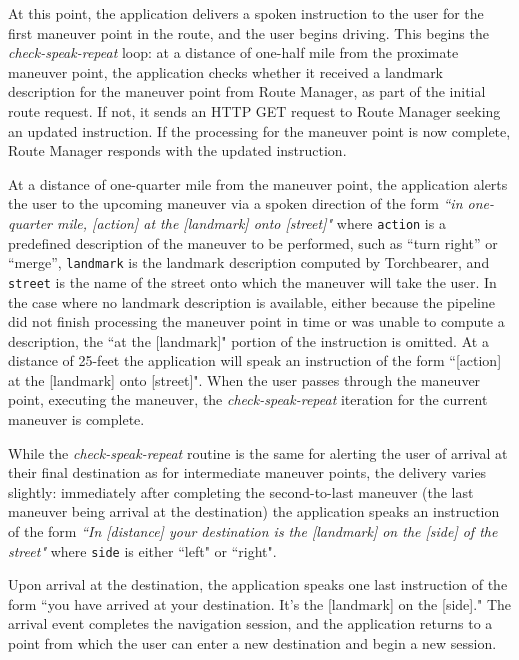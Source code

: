 At this point, the application delivers a spoken instruction to the user for the first maneuver point in the route, and the user begins driving. This begins the \textit{check-speak-repeat} loop: at a distance of one-half mile from the proximate maneuver point, the application checks whether it received a landmark description for the maneuver point from Route Manager, as part of the initial route request. If not, it sends an HTTP GET request to Route Manager seeking an updated instruction. If the processing for the maneuver point is now complete, Route Manager responds with the updated instruction. 

At a distance of one-quarter mile from the maneuver point, the application alerts the user to the upcoming maneuver via a spoken direction of the form \textit{``in one-quarter mile, [action] at the [landmark] onto [street]"} where \texttt{action} is a predefined description of the maneuver to be performed, such as “turn right” or “merge”, \texttt{landmark} is the landmark description computed by Torchbearer, and \texttt{street} is the name of the street onto which the maneuver will take the user. In the case where no landmark description is available, either because the pipeline did not finish processing the maneuver point in time or was unable to compute a description, the ``at the [landmark]" portion of the instruction is omitted. At a distance of 25-feet the application will speak an instruction of the form ``[action] at the [landmark] onto [street]". When the user passes through the maneuver point, executing the maneuver, the \textit{check-speak-repeat} iteration for the current maneuver is complete.

While the \textit{check-speak-repeat} routine is the same for alerting the user of arrival at their final destination as for intermediate maneuver points, the delivery varies slightly: immediately after completing the second-to-last maneuver (the last maneuver being arrival at the destination) the application speaks an instruction of the form \textit{``In [distance] your destination is the [landmark] on the [side] of the street"} where \texttt{side} is either ``left" or ``right".

Upon arrival at the destination, the application speaks one last instruction of the form ``you have arrived at your destination. It's the [landmark] on the [side]." The arrival event completes the navigation session, and the application returns to a point from which the user can enter a new destination and begin a new session.

